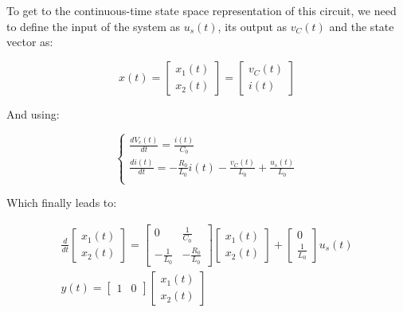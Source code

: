 To get to the continuous-time state space representation of this circuit, we need to define the input of the system as $u_s(t)$, its output as $v_C(t)$ and the state vector as:

\begin{equation}
    x(t) = \begin{bmatrix} x_1(t) \\ x_2(t) \end{bmatrix} = \begin{bmatrix} v_C(t) \\ i(t) \end{bmatrix}
\end{equation}

And using:

\begin{equation}
    \begin{cases}
    
    \frac{d V_c(t)}{dt} = \frac{i(t)}{C_0} \\
    \frac{d i(t)}{dt}  =  - \frac{R_0}{L_0} i(t) - \frac{v_C(t)}{L_0}  + \frac{u_s(t)}{L_0}\\

    \end{cases}
\end{equation}

Which finally leads to:

\begin{gather}
    \frac{d}{dt} \begin{bmatrix} x_1(t) \\ x_2(t) \end{bmatrix} = \begin{bmatrix} 0 & \frac{1}{C_0} \\ -\frac{1}{L_0} & -\frac{R_0}{L_0} \end{bmatrix} \begin{bmatrix} x_1(t) \\ x_2(t) \end{bmatrix} + \begin{bmatrix} 0 \\ \frac{1}{L_0} \end{bmatrix} u_s(t)\\
    y(t) = \begin{bmatrix} 1 & 0 \end{bmatrix} \begin{bmatrix} x_1(t) \\ x_2(t) \end{bmatrix}
\end{gather}

